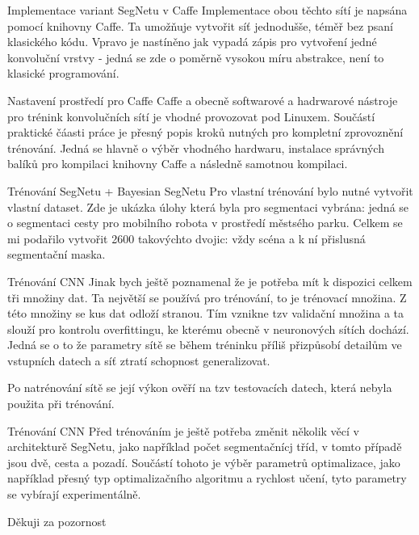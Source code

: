 \documentclass[aspectratio=1610]{beamer}
\begin{document}
\begin{frame}{Implementace variant SegNetu v Caffe}	
Implementace obou těchto sítí je napsána pomocí knihovny Caffe. Ta umožňuje vytvořit síť jednodušše, téměř bez psaní klasického kódu. Vpravo je nastíněno jak vypadá zápis pro vytvoření jedné konvoluční vrstvy - jedná se zde o poměrně vysokou míru abstrakce, není to klasické programování. 
\end{frame}
\begin{frame}{Nastavení prostředí pro Caffe}
Caffe a obecně softwarové a hadrwarové nástroje pro trénink konvolučních sítí je vhodné provozovat pod Linuxem. Součástí praktické čáasti práce je přesný popis kroků nutných pro kompletní zprovoznění trénování. Jedná se hlavně o výběr vhodného hardwaru, instalace správných balíků pro kompilaci knihovny Caffe a následně samotnou kompilaci.
\end{frame}
\begin{frame}{Trénování SegNetu + Bayesian SegNetu}
Pro vlastní trénování bylo nutné vytvořit vlastní dataset. Zde je ukázka úlohy která byla pro segmentaci vybrána: jedná se o segmentaci cesty pro mobilního robota v prostředí městsého parku. Celkem se mi podařilo vytvořit 2600 takovýchto dvojic: vždy scéna a k ní přislusná segmentační maska.  
\end{frame}
\begin{frame}{Trénování CNN}
Jinak bych ještě poznamenal že je potřeba mít k dispozici celkem tři množiny dat. Ta největší se používá pro trénování, to je trénovací množina. Z této množiny se kus dat odloží stranou. Tím vznikne tzv validační množina a ta slouží pro kontrolu overfittingu, ke kterému obecně v neuronových sítích dochází. Jedná se o to že parametry sítě se během tréninku příliš přizpůsobí detailům ve vstupních datech a síť ztratí schopnost generalizovat. 

Po natrénování sítě se její výkon ověří na tzv testovacích datech, která nebyla použita při trénování.  
\end{frame}
\begin{frame}{Trénování CNN}
Před trénováním je ještě potřeba změnit několik věcí v architekturě SegNetu, jako například počet segmentačnícj tříd, v tomto případě jsou dvě, cesta a pozadí. Součástí tohoto je výběr parametrů optimalizace, jako například přesný typ optimalizačního algoritmu a rychlost učení, tyto parametry se vybírají experimentálně.  
\end{frame}
\begin{frame}{}
	\centering
	{\Large Děkuji za pozornost}	
\end{frame}
\end{document}
